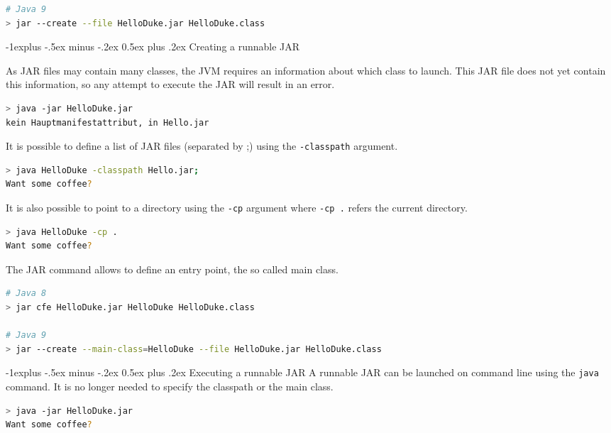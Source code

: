 \documentclass[10pt,landscape]{article}
\makeatletter
\renewcommand{\subsection}{\@startsection{subsection}{2}{0mm}%
                                {-1explus -.5ex minus -.2ex}%
                                {0.5ex plus .2ex}%
                                {\normalfont\normalsize\bfseries}}
\makeatother
\begin{document}
\begin{multicols}{2}
\begin{lstlisting}[language=bash,frame=single]
# Java 9
> jar --create --file HelloDuke.jar HelloDuke.class
\end{lstlisting}

\subsection{Creating a runnable JAR}

As JAR files may contain many classes, the JVM requires an information about which class to launch. This JAR file does not yet contain this information, so any attempt to execute the JAR will result in an error.
\begin{lstlisting}[language=bash,frame=single]
> java -jar HelloDuke.jar
kein Hauptmanifestattribut, in Hello.jar
\end{lstlisting}
It is possible to define a list of JAR files (separated by ;) using the \texttt{-classpath} argument.
\begin{lstlisting}[language=bash,frame=single]
> java HelloDuke -classpath Hello.jar;
Want some coffee?

\end{lstlisting}
It is also possible to point to a directory using the  \texttt{-cp} argument where  \texttt{-cp .} refers the current directory.
\begin{lstlisting}[language=bash,frame=single]
> java HelloDuke -cp .
Want some coffee?

\end{lstlisting}
The JAR command allows to define an entry point, the so called main class. 
\begin{lstlisting}[language=bash,frame=single,breaklines=true]
# Java 8 
> jar cfe HelloDuke.jar HelloDuke HelloDuke.class

# Java 9 
> jar --create --main-class=HelloDuke --file HelloDuke.jar HelloDuke.class
\end{lstlisting}

\subsection{Executing a runnable JAR}
A runnable JAR can be launched on command line using the \texttt{java} command. It is no longer needed to specify the classpath or the main class.  
\begin{lstlisting}[language=bash,frame=single]
> java -jar HelloDuke.jar
Want some coffee?


\end{lstlisting}
\end{multicols}
\end{document}
